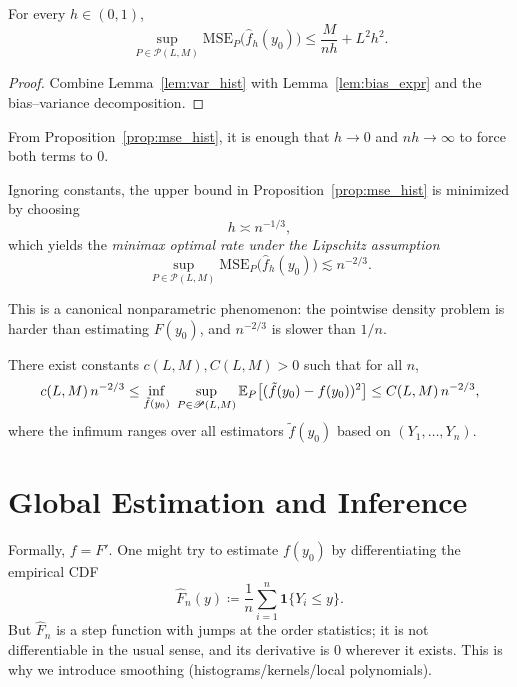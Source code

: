 \begin{proposition}\label{prop:mse_hist}
	For every $h\in(0,1)$,
	\[
		\sup_{P\in\mathscr P(L,M)} \mathrm{MSE}_P\big(\hat f_h(y_0)\big)
		\le
		\frac{M}{nh}+L^2h^2.
	\]
\end{proposition}

\begin{proof}
	Combine Lemma~\ref{lem:var_hist} with Lemma~\ref{lem:bias_expr} and the bias--variance decomposition.
\end{proof}

\begin{remark}
	From Proposition~\ref{prop:mse_hist}, it is enough that $h\to 0$ and $nh\to\infty$ to force both terms to $0$.
\end{remark}

Ignoring constants, the upper bound in Proposition~\ref{prop:mse_hist} is minimized by choosing
\[
	h \asymp n^{-1/3},
\]
which yields the \emph{minimax optimal rate under the Lipschitz assumption}
\[
	\sup_{P\in\mathscr P(L,M)} \mathrm{MSE}_P\big(\hat f_h(y_0)\big)\lesssim n^{-2/3}.
\]

\begin{remark}	This is a canonical nonparametric phenomenon: the pointwise density problem is harder than estimating $F(y_0)$,
	and $n^{-2/3}$ is slower than $1/n$.
\end{remark}

\begin{theorem}\label{thm:minimax_pointwise}
	There exist constants $c(L,M),C(L,M)>0$ such that for all $n$,
	\[
		c(L,M)\,n^{-2/3}
		\le
		\inf_{\tilde f(y_0)}\ \sup_{P\in\mathscr P(L,M)} \mathbb{E}_P\big[(\tilde f(y_0)-f(y_0))^2\big]
		\le
		C(L,M)\,n^{-2/3},
	\]
	where the infimum ranges over all estimators $\tilde f(y_0)$ based on $(Y_1,\dots,Y_n)$.
\end{theorem}

\section{Global Estimation and Inference}

\begin{remark}	Formally, $f = F'$. One might try to estimate $f(y_0)$ by differentiating the empirical CDF
	\[
		\hat F_n(y)\coloneqq\frac1n\sum_{i=1}^n \mathbf 1\{Y_i\le y\}.
	\]
	But $\hat F_n$ is a step function with jumps at the order statistics; it is not differentiable in the usual sense,
	and its derivative is $0$ wherever it exists. This is why we introduce smoothing (histograms/kernels/local polynomials).
\end{remark}

